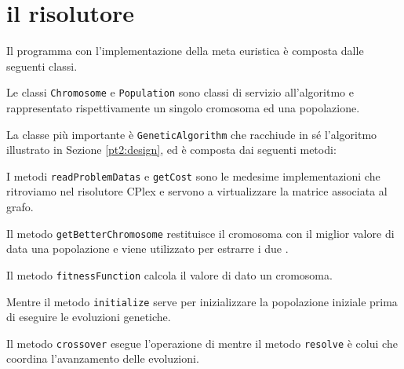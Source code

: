 %
%
\section[Il risolutore]{il risolutore}
\label{pt2:solver}
Il programma con l'implementazione della meta euristica è composta dalle seguenti classi.


Le classi \texttt{Chromosome} e \texttt{Population} sono classi di servizio all'algoritmo e rappresentato rispettivamente un singolo cromosoma ed una popolazione.

La classe più importante è \texttt{GeneticAlgorithm} che racchiude in sé l'algoritmo illustrato in Sezione \ref{pt2:design}, ed è composta dai seguenti metodi:


I metodi \texttt{readProblemDatas} e \texttt{getCost} sono le medesime implementazioni che ritroviamo nel risolutore CPlex e servono a virtualizzare la matrice associata al grafo.

Il metodo \texttt{getBetterChromosome} restituisce il cromosoma con il miglior valore di  data una popolazione e viene utilizzato per estrarre i due .

Il metodo \texttt{fitnessFunction} calcola il valore di  dato un cromosoma.

Mentre il metodo \texttt{initialize} serve per inizializzare la popolazione iniziale prima di eseguire le evoluzioni genetiche.

Il metodo \texttt{crossover} esegue l'operazione di  mentre il metodo \texttt{resolve} è colui che coordina l'avanzamento delle evoluzioni.